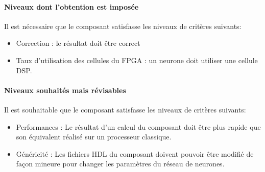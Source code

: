 \paragraph{Niveaux dont l’obtention est imposée\\}

Il est nécessaire que le composant satisfasse les niveaux de critères suivants:
\begin{itemize}
	\item Correction : le résultat doit être correct
	\item Taux d'utilisation des cellules du FPGA : un neurone doit utiliser
		une cellule DSP.
\end{itemize}

\paragraph{Niveaux souhaités mais révisables\\}

Il est souhaitable que le composant satisfasse les niveaux de critères suivants:
\begin{itemize}
	\item Performances : Le résultat d'un calcul du composant doit être plus
		rapide que son équivalent réalisé sur un processeur classique.
	\item Généricité : Les fichiers HDL du composant doivent pouvoir être
		modifié de façon mineure pour changer les paramètres du réseau
		de neurones.
\end{itemize}


